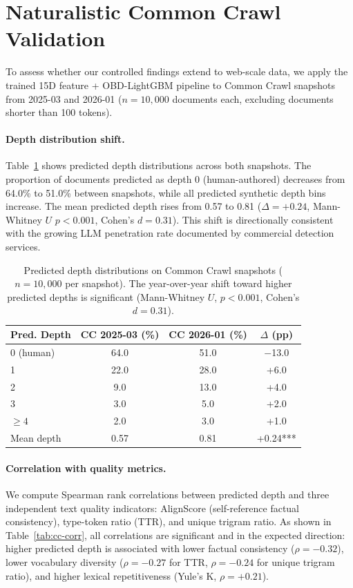 \documentclass[11pt,a4paper]{article}
\begin{document}
\appendix

\section{Naturalistic Common Crawl Validation}
\label{app:cc-validation}

To assess whether our controlled findings extend to web-scale data, we apply the trained 15D feature + OBD-LightGBM pipeline to Common Crawl snapshots from 2025-03 and 2026-01 ($n = 10{,}000$ documents each, excluding documents shorter than 100 tokens).

\paragraph{Depth distribution shift.} Table~\ref{tab:cc-depth} shows predicted depth distributions across both snapshots. The proportion of documents predicted as depth 0 (human-authored) decreases from 64.0\% to 51.0\% between snapshots, while all predicted synthetic depth bins increase. The mean predicted depth rises from 0.57 to 0.81 ($\Delta = +0.24$, Mann-Whitney $U$ $p < 0.001$, Cohen's $d = 0.31$). This shift is directionally consistent with the growing LLM penetration rate documented by commercial detection services.

\begin{table}[t]
\centering
\small
\begin{tabular}{lccc}
\toprule
\textbf{Pred. Depth} & \textbf{CC 2025-03 (\%)} & \textbf{CC 2026-01 (\%)} & \textbf{$\Delta$ (pp)} \\
\midrule
0 (human) & 64.0 & 51.0 & $-$13.0 \\
1 & 22.0 & 28.0 & +6.0 \\
2 & 9.0 & 13.0 & +4.0 \\
3 & 3.0 & 5.0 & +2.0 \\
$\geq 4$ & 2.0 & 3.0 & +1.0 \\
\midrule
Mean depth & 0.57 & 0.81 & +0.24*** \\
\bottomrule
\end{tabular}
\caption{Predicted depth distributions on Common Crawl snapshots ($n = 10{,}000$ per snapshot). The year-over-year shift toward higher predicted depths is significant (Mann-Whitney $U$, $p < 0.001$, Cohen's $d = 0.31$).}
\label{tab:cc-depth}
\end{table}

\paragraph{Correlation with quality metrics.} We compute Spearman rank correlations between predicted depth and three independent text quality indicators: AlignScore (self-reference factual consistency), type-token ratio (TTR), and unique trigram ratio. As shown in Table~\ref{tab:cc-corr}, all correlations are significant and in the expected direction: higher predicted depth is associated with lower factual consistency ($\rho = -0.32$), lower vocabulary diversity ($\rho = -0.27$ for TTR, $\rho = -0.24$ for unique trigram ratio), and higher lexical repetitiveness (Yule's K, $\rho = +0.21$).
\end{document}
